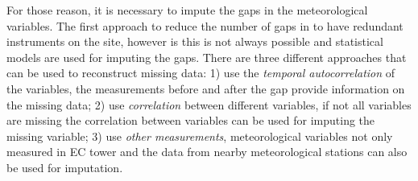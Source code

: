 \documentclass{article}
\let\Oldsubsection\subsection
\renewcommand{\subsection}{\FloatBarrier\Oldsubsection}
\begin{document}
For those reason, it is necessary to impute the gaps in the meteorological variables. The first approach to reduce the number of gaps in to have redundant instruments on the site, however is this is not always possible and statistical models are used for imputing the gaps. There are three different approaches that can be used to reconstruct missing data: 1) use the \textit{temporal autocorrelation} of the variables, the measurements  before and after the gap provide information on the missing data; 2) use \textit{correlation} between different variables, if not all variables are missing the correlation between variables can be used for imputing the missing variable; 3) use \textit{other measurements}, meteorological variables not only measured in EC tower and the data from nearby meteorological stations can also be used for imputation.






 
\end{document}
